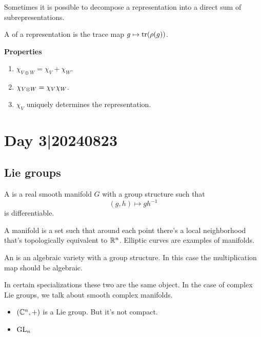 \documentclass[12pt]{memoir}
\begin{document}
Sometimes it is possible to decompose a representation into a direct sum of subrepresentations.


\begin{Def}
    A  of a representation is the trace map $g\mapsto\tr(\rho(g))$.
\end{Def}

\textbf{Properties}
\begin{enumerate}
    \item $\chi_{V\oplus W}=\chi_V+\chi_W$. 
    \item $\chi_{V\otimes W}=\chi_V\chi_W$.
    \item $\chi_V$ uniquely determines the representation.
\end{enumerate}

\section{Day 3|20240823}

\subsection{Lie groups}

\begin{Def}
    A  is a real smooth manifold $G$ with a group structure such that 
    $$(g,h)\mapsto gh^{-1}$$
    is differentiable.
\end{Def}

A manifold is a set such that around each point there's a local neighborhood that's topologically equivalent to $\mathbb{R}^n$. Elliptic curves are examples of manifolds.

\begin{Def}
    An  is an algebraic variety with a group structure. In this case the multiplication map should be algebraic.
\end{Def}

In certain specializations these two are the same object. In the case of complex Lie groups, we talk about smooth complex manifolds.

\begin{Ex}
    \begin{itemize}
        \item $(\mathbb{C}^n,+)$ is a Lie group. But it's not compact. 
        \item $\mathrm{GL}_n$
    \end{itemize}
\end{Ex}
\end{document}

